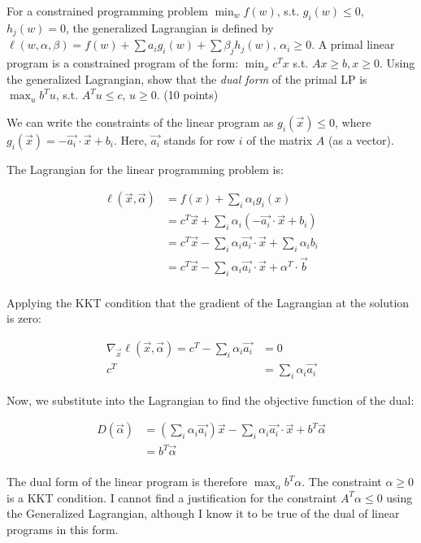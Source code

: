 \documentclass[fleqn]{homework}
\begin{document}
  \begin{problem}{2}
    \begin{question}
      For a constrained programming problem $\min_w f(w)$, s.t. $g_i(w) \le 0$,
      $h_j(w) = 0$, the generalized Lagrangian is defined by
      $\ell(w, \alpha, \beta) = f(w) + \sum a_i g_i(w) + \sum \beta_j h_j(w)$,
      $\alpha_i \ge 0$.  A primal linear program is a constrained program of the
      form: $\min_x c^Tx$ s.t. $Ax \ge b, x \ge 0$.  Using the generalized
      Lagrangian, show that the \textit{dual form} of the primal LP is
      $\max_u b^T u$, s.t. $A^T u \le c$, $u \ge 0$. (10 points)
    \end{question}

    We can write the constraints of the linear program as $g_i(\vec{x}) \le 0$,
    where $g_i(\vec{x}) = - \vec{a_i} \cdot \vec{x} + b_i$.  Here, $\vec{a_i}$
    stands for row $i$ of the matrix $A$ (as a vector).

    The Lagrangian for the linear programming problem is:

    \begin{align*}
      \ell(\vec{x}, \vec{\alpha})
      &= f(x) + \sum_i \alpha_i g_i(x) \\
      &= c^T \vec{x} + \sum_i \alpha_i (-\vec{a_i} \cdot \vec{x} + b_i) \\
      &= c^T \vec{x} - \sum_i \alpha_i \vec{a_i} \cdot \vec{x} + \sum_i \alpha_i b_i \\
      &= c^T \vec{x} - \sum_i \alpha_i \vec{a_i} \cdot \vec{x} + \alpha^T \cdot \vec{b} \\
    \end{align*}

    Applying the KKT condition that the gradient of the Lagrangian at the
    solution is zero:

    \begin{align*}
      \nabla_{\vec{x}}\ell(\vec{x}, \vec{\alpha})
      = c^T - \sum_i \alpha_i \vec{a_i} &= 0 \\
      c^T &= \sum_i \alpha_i \vec{a_i}
    \end{align*}

    Now, we substitute into the Lagrangian to find the objective function of the
    dual:

    \begin{align*}
      D(\vec{\alpha}) &= \left(\sum_i \alpha_i \vec{a_i}\right)\vec{x} - \sum_i \alpha_i \vec{a_i} \cdot \vec{x} + b^T \vec{\alpha} \\
      &= b^T \vec{\alpha} \\
    \end{align*}

    The dual form of the linear program is therefore $\max_\alpha b^T \alpha$.
    The constraint $\alpha \ge 0$ is a KKT condition.  I cannot find a
    justification for the constraint $A^T \alpha \le 0$ using the Generalized
    Lagrangian, although I know it to be true of the dual of linear programs in
    this form.
  \end{problem}
\end{document}

